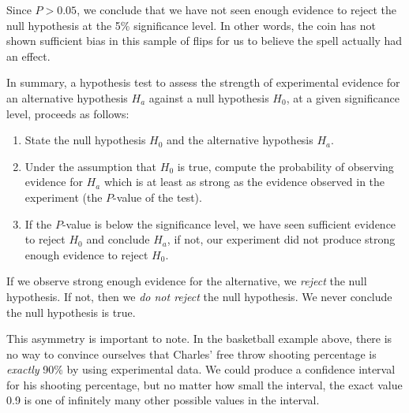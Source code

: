 \begin{example}
\begin{center}
\end{center}

Since $P >0.05$, we conclude that we have not seen enough evidence to reject the null hypothesis at the 5\% significance level. In other words, the coin has not shown sufficient bias in this sample of flips for us to believe the spell actually had an effect.
\end{example}

In summary, a hypothesis test to assess the strength of experimental evidence for an alternative hypothesis $H_a$ against a null hypothesis $H_0$, at a given significance level, proceeds as follows:
\begin{enumerate}[label=\Roman*.]
\item State the null hypothesis $H_0$ and the alternative hypothesis $H_a$.
\item Under the assumption that $H_0$ is true, compute the probability of observing evidence for $H_a$ which is at least as strong as the evidence observed in the experiment (the $P$-value of the test).
\item If the $P$-value is below the significance level, we have seen sufficient evidence to reject $H_0$ and conclude $H_a$, if not, our experiment did not produce strong enough evidence to reject $H_0$.
\end{enumerate}

\begin{keypoint}
If we observe strong enough evidence for the alternative, we \emph{reject} the null hypothesis. If not, then we \emph{do not reject} the null hypothesis. We never conclude the null hypothesis is true.
\end{keypoint}

This asymmetry is important to note. In the basketball example above, there is no way to convince ourselves that Charles' free throw shooting percentage is \emph{exactly} 90\% by using experimental data. We could produce a confidence interval for his shooting percentage, but no matter how small the interval, the exact value 0.9 is one of infinitely many other possible values in the interval.

